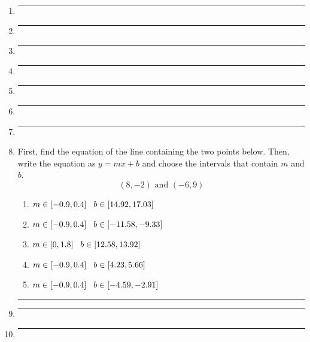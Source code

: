 \documentclass[14pt]{extbook}
\newcommand{\litem}[1]{\item#1\hspace*{-1cm}\rule{\textwidth}{0.4pt}}
\begin{document}
\begin{enumerate}
{\begin{enumerate}[label=\Alph*.]
\end{enumerate} }
\litem{
\begin{enumerate}[label=\Alph*.]

\end{enumerate} }
\litem{
\begin{enumerate}[label=\Alph*.]

\end{enumerate} }
\litem{
\begin{enumerate}[label=\Alph*.]

\end{enumerate} }
\litem{
\begin{enumerate}[label=\Alph*.]

\end{enumerate} }
\litem{
\begin{enumerate}[label=\Alph*.]

\end{enumerate} }
\litem{
\begin{enumerate}[label=\Alph*.]

\end{enumerate} }
\litem{
\begin{enumerate}[label=\Alph*.]

\end{enumerate} }
\litem{
First, find the equation of the line containing the two points below. Then, write the equation as $ y=mx+b $ and choose the intervals that contain $m$ and $b$.\[ (8, -2) \text{ and } (-6, 9) \]\begin{enumerate}[label=\Alph*.]
\item \( m \in [-0.9, 0.4] \hspace*{3mm} b \in [14.92, 17.03] \)
\item \( m \in [-0.9, 0.4] \hspace*{3mm} b \in [-11.58, -9.33] \)
\item \( m \in [0, 1.8] \hspace*{3mm} b \in [12.58, 13.92] \)
\item \( m \in [-0.9, 0.4] \hspace*{3mm} b \in [4.23, 5.66] \)
\item \( m \in [-0.9, 0.4] \hspace*{3mm} b \in [-4.59, -2.91] \)

\end{enumerate} }
\litem{
\begin{enumerate}[label=\Alph*.]

\end{enumerate} }
\litem{
\begin{enumerate}[label=\Alph*.]


\end{enumerate}}
\end{enumerate}
\end{document}
